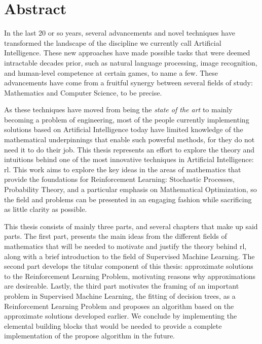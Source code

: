 \chapter*{Abstract}
In the last 20 or so years, several advancements and novel
techniques have transformed the landscape of the discipline we currently call
Artificial Intelligence. These new approaches have made possible tasks that were
deemed intractable decades prior, such as natural language processing, image
recognition, and human-level competence at certain games, to name a few. These
advancements have come from a fruitful synergy between several fields of study:
Mathematics and Computer Science, to be precise.

As these techniques have moved from being the \textit{state of the art} to
mainly becoming a problem of engineering, most of the people currently
implementing solutions based on Artificial Intelligence today have limited
knowledge of the mathematical underpinnings that enable such powerful methods,
for they do not need it to do their job. This thesis represents an effort to
explore the theory and intuitions behind one of the most innovative techniques
in Artificial Intelligence: \acf{rl}. This work aims to explore the key ideas in
the areas of mathematics that provide the foundations for Reinforcement
Learning: Stochastic Processes, Probability Theory, and a particular emphasis on
Mathematical Optimization, so the field and problems can be presented in an
engaging fashion while sacrificing as little clarity as possible.

This thesis consists of mainly three parts, and several chapters that make up
said parts. The first part, presents the main ideas from the different fields of
mathematics that will be needed to motivate and justify the theory behind
\ac{rl}, along with a brief introduction to the field of Supervised Machine
Learning. The second part develops the titular component of this thesis:
approximate solutions to the Reinforcement Learning Problem, motivating reasons
why approximations are desireable. Lastly, the third part motivates the framing
of an important problem in Supervised Machine Learning, the fitting of decision
trees, as a Reinforcement Learning Problem and proposes an algorithm based on
the approximate solutions developed earlier. We conclude by implementing the
elemental building blocks that would be needed to provide a complete
implementation of the propose algorithm in the future.
